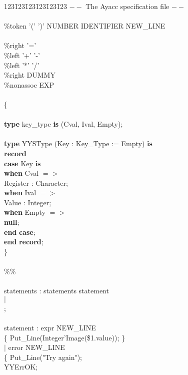 \begin{tabbing}
123\=123\=123\=123\=123\=123 \kill
\>\>\>\>                 $--$ The Ayacc specification file  $--$\\
\\
\%token '(' ')' NUMBER IDENTIFIER NEW\_LINE\\
\\
\%right     '='\\
\%left      '+' '-'\\
\%left      '*' '/'\\
\%right     DUMMY\\
\%nonassoc  EXP\\
\\
\{\\
\\
{\bf type} key\_type {\bf is} (Cval, Ival, Empty);\\
\\
{\bf type} YYSType (Key : Key\_Type := Empty)  {\bf is}\\
\>  {\bf record}\\
\>\>    {\bf case} Key {\bf is}\\
\>\>\>      {\bf when} Cval  $=>$\\
\>\>\>\>        Register : Character;\\
\>\>\>      {\bf when} Ival  $=>$\\
\>\>\>\>        Value    : Integer;\\
\>\>\>      {\bf when} Empty $=>$\\
\>\>\>\>        {\bf null};\\
\>\>\>    {\bf end} {\bf case};\\
\>\>  {\bf end} {\bf record};\\
\}\\
\\
\%\%\\
\\
statements : statements statement\\
\>\>\>           $|$\\
\>\>\>           ;\\
\\
statement  : expr NEW\_LINE\\
\>\>\>\>               \{ Put\_Line(Integer'Image(\$1.value)); \}\\
\>\>\>           $|$ error NEW\_LINE\\
\>\>\>\>               \{ Put\_Line("Try again");\\
\>\>\>\>                  YYErrOK;\\

\end{tabbing}
